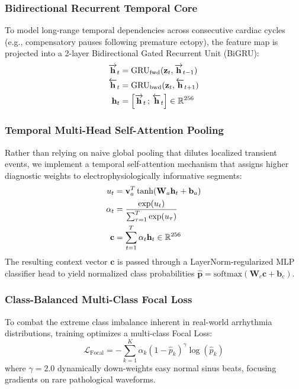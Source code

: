 \subsubsection{Bidirectional Recurrent Temporal Core}
To model long-range temporal dependencies across consecutive cardiac cycles (e.g., compensatory pauses following premature ectopy), the feature map is projected into a 2-layer Bidirectional Gated Recurrent Unit (BiGRU):
\begin{align}
    \overrightarrow{\mathbf{h}}_t &= \text{GRU}_{\text{fwd}}(\mathbf{z}_t, \overrightarrow{\mathbf{h}}_{t-1}) \\
    \overleftarrow{\mathbf{h}}_t &= \text{GRU}_{\text{bwd}}(\mathbf{z}_t, \overleftarrow{\mathbf{h}}_{t+1}) \\
    \mathbf{h}_t &= \left[\overrightarrow{\mathbf{h}}_t \,;\, \overleftarrow{\mathbf{h}}_t\right] \in \mathbb{R}^{256}
\end{align}

\subsubsection{Temporal Multi-Head Self-Attention Pooling}
Rather than relying on naive global pooling that dilutes localized transient events, we implement a temporal self-attention mechanism that assigns higher diagnostic weights to electrophysiologically informative segments:
\begin{align}
    u_t &= \mathbf{v}_a^T \tanh(\mathbf{W}_a \mathbf{h}_t + \mathbf{b}_a) \\
    \alpha_t &= \frac{\exp(u_t)}{\sum_{\tau=1}^T \exp(u_\tau)} \\
    \mathbf{c} &= \sum_{t=1}^T \alpha_t \mathbf{h}_t \in \mathbb{R}^{256}
\end{align}
The resulting context vector $\mathbf{c}$ is passed through a LayerNorm-regularized MLP classifier head to yield normalized class probabilities $\hat{\mathbf{p}} = \text{softmax}(\mathbf{W}_c \mathbf{c} + \mathbf{b}_c)$.

\subsubsection{Class-Balanced Multi-Class Focal Loss}
To combat the extreme class imbalance inherent in real-world arrhythmia distributions, training optimizes a multi-class Focal Loss:
\begin{equation}
    \mathcal{L}_{\text{Focal}} = -\sum_{k=1}^K \alpha_k (1 - \hat{p}_k)^\gamma \log(\hat{p}_k)
\end{equation}
where $\gamma = 2.0$ dynamically down-weights easy normal sinus beats, focusing gradients on rare pathological waveforms.

